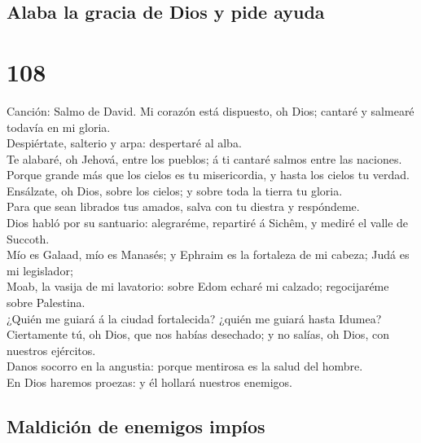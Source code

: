 \hypertarget{alaba-la-gracia-de-dios-y-pide-ayuda}{%
\subsection{Alaba la gracia de Dios y pide
ayuda}\label{alaba-la-gracia-de-dios-y-pide-ayuda}}

\hypertarget{section-19-108}{%
\section{108}\label{section-19-108}}

 Canción: Salmo de David. Mi corazón está dispuesto, oh
Dios; cantaré y salmearé todavía en mi gloria.\\
 Despiértate, salterio y arpa: despertaré al alba.\\
 Te alabaré, oh Jehová, entre los pueblos; á ti cantaré
salmos entre las naciones.\\
 Porque grande más que los cielos es tu misericordia, y
hasta los cielos tu verdad.\\
 Ensálzate, oh Dios, sobre los cielos; y sobre toda la
tierra tu gloria.\\
 Para que sean librados tus amados, salva con tu diestra y
respóndeme.\\
 Dios habló por su santuario: alegraréme, repartiré á
Sichêm, y mediré el valle de Succoth.\\
 Mío es Galaad, mío es Manasés; y Ephraim es la fortaleza
de mi cabeza; Judá es mi legislador;\\
 Moab, la vasija de mi lavatorio: sobre Edom echaré mi
calzado; regocijaréme sobre Palestina.\\
 ¿Quién me guiará á la ciudad fortalecida? ¿quién me
guiará hasta Idumea?\\
 Ciertamente tú, oh Dios, que nos habías desechado; y no
salías, oh Dios, con nuestros ejércitos.\\
 Danos socorro en la angustia: porque mentirosa es la
salud del hombre.\\
 En Dios haremos proezas: y él hollará nuestros enemigos.

\hypertarget{maldiciuxf3n-de-enemigos-impuxedos}{%
\subsection{Maldición de enemigos
impíos}\label{maldiciuxf3n-de-enemigos-impuxedos}}

